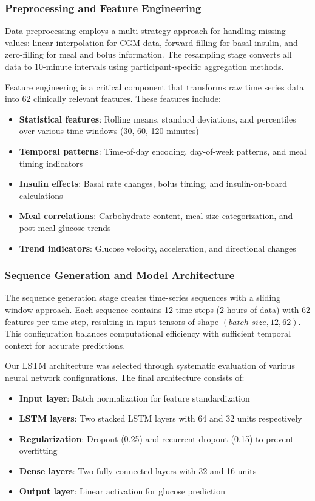 \documentclass[acmsmall]{acmart}
\begin{document}
\subsubsection{Preprocessing and Feature Engineering}

Data preprocessing employs a multi-strategy approach for handling missing values: linear interpolation for CGM data, forward-filling for basal insulin, and zero-filling for meal and bolus information. The resampling stage converts all data to 10-minute intervals using participant-specific aggregation methods.

Feature engineering is a critical component that transforms raw time series data into 62 clinically relevant features. These features include:
\begin{itemize}
  \item \textbf{Statistical features}: Rolling means, standard deviations, and percentiles over various time windows (30, 60, 120 minutes)
  \item \textbf{Temporal patterns}: Time-of-day encoding, day-of-week patterns, and meal timing indicators
  \item \textbf{Insulin effects}: Basal rate changes, bolus timing, and insulin-on-board calculations
  \item \textbf{Meal correlations}: Carbohydrate content, meal size categorization, and post-meal glucose trends
  \item \textbf{Trend indicators}: Glucose velocity, acceleration, and directional changes
\end{itemize}

\subsubsection{Sequence Generation and Model Architecture}

The sequence generation stage creates time-series sequences with a sliding window approach. Each sequence contains 12 time steps (2 hours of data) with 62 features per time step, resulting in input tensors of shape $(batch\_size, 12, 62)$. This configuration balances computational efficiency with sufficient temporal context for accurate predictions.

Our LSTM architecture was selected through systematic evaluation of various neural network configurations. The final architecture consists of:
\begin{itemize}
  \item \textbf{Input layer}: Batch normalization for feature standardization
  \item \textbf{LSTM layers}: Two stacked LSTM layers with 64 and 32 units respectively
  \item \textbf{Regularization}: Dropout (0.25) and recurrent dropout (0.15) to prevent overfitting
  \item \textbf{Dense layers}: Two fully connected layers with 32 and 16 units
  \item \textbf{Output layer}: Linear activation for glucose prediction
\end{itemize}
\end{document}
